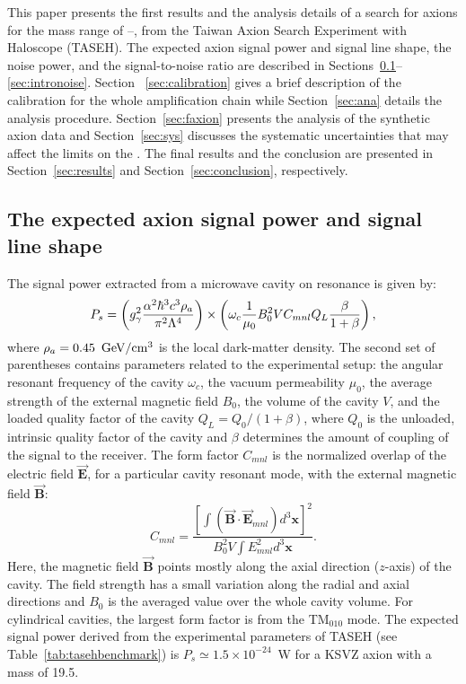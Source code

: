 This paper presents the first results and the analysis 
details of a search for axions for the mass range of \mlo--\mhi\muevcc, 
from the Taiwan Axion Search Experiment with Haloscope (TASEH). 
The expected axion signal power and signal line shape, the noise power, 
and the signal-to-noise ratio are described in 
Sections~\ref{sec:introsignal}--\ref{sec:intronoise}. Section 
~\ref{sec:calibration} gives a brief 
description of the calibration for the whole amplification chain 
while Section~\ref{sec:ana} details the analysis procedure.  
Section~\ref{sec:faxion} presents the analysis of the 
synthetic axion 
data and Section~\ref{sec:sys} discusses the systematic 
uncertainties that may affect the limits on the \gagg. 
The final results and the conclusion are presented in 
Section~\ref{sec:results} and Section~\ref{sec:conclusion}, 
respectively. 


\subsection{The expected axion signal power and signal line shape}
\label{sec:introsignal}

The signal power extracted from a microwave cavity on resonance is given 
by:
\begin{equation}
P_s = \left(g_{\gamma}^2\frac{\alpha^2\hbar^3c^3\rho_a}{\pi^2\Lambda^4}\right)\times
\left(\omega_c\frac{1}{\mu_0}B_0^2VC_{mnl}Q_L\frac{\beta}{1+\beta}\right),
\label{eq:ps}
\end{equation}
where $\rho_a=0.45~\,\text{Ge\hspace{-.08em}V}/\mathrm{cm}^3$ is the local dark-matter density. 
The second set of parentheses contains parameters related to the experimental 
setup: the angular resonant frequency of the cavity $\omega_c$, 
the vacuum permeability $\mu_0$, the average strength of the external magnetic 
field $B_0$, the volume of the cavity $V$, and the loaded quality factor of the 
cavity 
\(Q_L=Q_0/(1+\beta)\), where $Q_0$ is the unloaded, intrinsic quality factor 
of the cavity and $\beta$ determines the amount of coupling of the signal to 
the receiver. The form factor $C_{mnl}$ is the normalized 
overlap of the electric field 
$\vec{\bm{E}}$, for a particular cavity resonant mode, with the external magnetic 
field $\vec{\bm{B}}$:
\begin{equation}
  C_{mnl} = \frac{\left[\int\left( \vec{\bm{B}}\cdot\vec{\bm{E}}_{mnl}\right) d^3\bm{x}\right]^2}{B_0^2V\int E_{mnl}^2 d^3\bm{x}}.
\label{eq:formfactor} 
\end{equation} 
Here, the magnetic field $\vec{\bm{B}}$ points mostly along the axial 
direction ($z$-axis) of the cavity. 
The field strength has a small variation along the radial and axial directions and 
$B_0$ is the averaged value over the whole cavity volume. 
For cylindrical cavities, the largest form factor is from the 
TM$_{010}$ mode. The expected signal power derived from the experimental 
parameters of TASEH (see Table~\ref{tab:tasehbenchmark}) 
is $P_s\simeq 1.5\times10^{-24}$~W for a KSVZ axion with a 
mass of 19.5\muevcc. 

